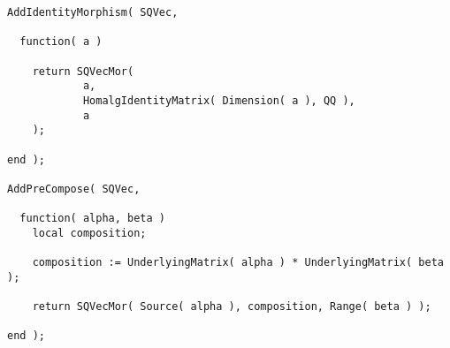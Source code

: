 \begin{small}
\begin{Verbatim}[frame=single]
AddIdentityMorphism( SQVec,
                     
  function( a )
    
    return SQVecMor(
            a,
            HomalgIdentityMatrix( Dimension( a ), QQ ),
            a
    );
    
end );

AddPreCompose( SQVec,

  function( alpha, beta )
    local composition;

    composition := UnderlyingMatrix( alpha ) * UnderlyingMatrix( beta );

    return SQVecMor( Source( alpha ), composition, Range( beta ) );

end );
\end{Verbatim}
\end{small}